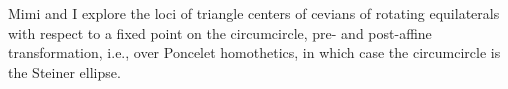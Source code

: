 Mimi and I explore the loci of triangle centers of cevians of rotating equilaterals with respect to a fixed point on the circumcircle, pre- and post-affine transformation, i.e., over Poncelet homothetics, in which case the circumcircle is the Steiner ellipse.